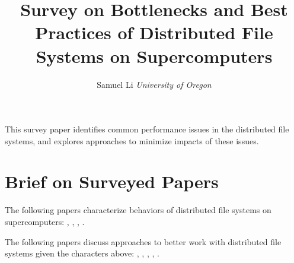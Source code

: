\documentclass[journal]{vgtc}                %
\title{
Survey on 
Bottlenecks and Best Practices of
Distributed File Systems on Supercomputers
}
\author{Samuel Li \textit{University of Oregon}}
\begin{document}

\maketitle
%
This survey paper identifies common performance issues in 
the distributed file systems, 
and explores approaches to minimize impacts of these issues.

\section{Brief on Surveyed Papers}
The following papers characterize behaviors of distributed file systems
on supercomputers:
\cite{Xie2012}, \cite{Henschel2012}, \cite{Crosby2009}, \cite{Borrill2009}.

The following papers discuss approaches to better work with distributed 
file systems given the characters above:
\cite{Shipman2010}, \cite{Yu2006}, \cite{Tian2011}, \cite{Lofstead2010},
\cite{Lofstead2009}.



\end{document}
